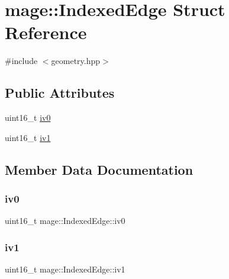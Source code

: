 \hypertarget{structmage_1_1_indexed_edge}{}\section{mage\+:\+:Indexed\+Edge Struct Reference}
\label{structmage_1_1_indexed_edge}


{\ttfamily \#include $<$geometry.\+hpp$>$}

\subsection*{Public Attributes}
\begin{DoxyCompactItemize}
\item 
uint16\+\_\+t \hyperlink{structmage_1_1_indexed_edge_a3aff35f469e9e96f7cf43a0cf7621a8f}{iv0}
\item 
uint16\+\_\+t \hyperlink{structmage_1_1_indexed_edge_ab78691aa78fe2fee801951d87fdfc0b0}{iv1}
\end{DoxyCompactItemize}


\subsection{Member Data Documentation}
\hypertarget{structmage_1_1_indexed_edge_a3aff35f469e9e96f7cf43a0cf7621a8f}{}\label{structmage_1_1_indexed_edge_a3aff35f469e9e96f7cf43a0cf7621a8f} 
\subsubsection{\texorpdfstring{iv0}{iv0}}
{\footnotesize\ttfamily uint16\+\_\+t mage\+::\+Indexed\+Edge\+::iv0}

\hypertarget{structmage_1_1_indexed_edge_ab78691aa78fe2fee801951d87fdfc0b0}{}\label{structmage_1_1_indexed_edge_ab78691aa78fe2fee801951d87fdfc0b0} 
\subsubsection{\texorpdfstring{iv1}{iv1}}
{\footnotesize\ttfamily uint16\+\_\+t mage\+::\+Indexed\+Edge\+::iv1}

